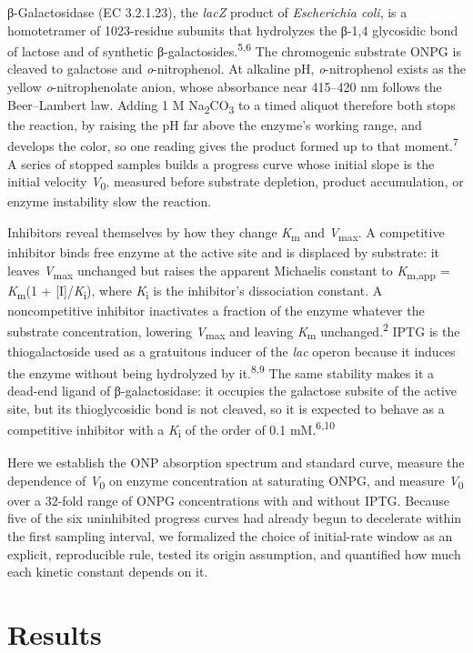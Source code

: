 \documentclass[9pt,twocolumn]{extarticle}
\newcommand{\cit}[1]{\textsuperscript{#1}}
\newcommand{\Km}{\textit{K}\textsubscript{m}}
\newcommand{\Kmapp}{\textit{K}\textsubscript{m,app}}
\newcommand{\Vmax}{\textit{V}\textsubscript{max}}
\newcommand{\Vo}{\textit{V}\textsubscript{0}}
\newcommand{\Ki}{\textit{K}\textsubscript{i}}
\newcommand{\Ecoli}{\textit{Escherichia coli}}
\newcommand{\lac}{\textit{lac}}
\newcommand{\lacZ}{\textit{lacZ}}
\newcommand{\onp}{\textit{o}-nitrophenol}
\newcommand{\dash}{–}
\begin{document}
β-Galactosidase (EC 3.2.1.23), the \lacZ{} product of \Ecoli, is a homotetramer of 1023-residue subunits that hydrolyzes the β-1,4 glycosidic bond of lactose and of synthetic β-galactosides.\cit{5,6} The chromogenic substrate ONPG is cleaved to galactose and \onp. At alkaline pH, \onp{} exists as the yellow \textit{o}-nitrophenolate anion, whose absorbance near 415\dash 420 nm follows the Beer\dash Lambert law. Adding 1 M Na\textsubscript{2}CO\textsubscript{3} to a timed aliquot therefore both stops the reaction, by raising the pH far above the enzyme's working range, and develops the color, so one reading gives the product formed up to that moment.\cit{7} A series of stopped samples builds a progress curve whose initial slope is the initial velocity \Vo, measured before substrate depletion, product accumulation, or enzyme instability slow the reaction.

Inhibitors reveal themselves by how they change \Km{} and \Vmax. A competitive inhibitor binds free enzyme at the active site and is displaced by substrate: it leaves \Vmax{} unchanged but raises the apparent Michaelis constant to \Kmapp{} = \Km(1 + [I]/\Ki), where \Ki{} is the inhibitor's dissociation constant. A noncompetitive inhibitor inactivates a fraction of the enzyme whatever the substrate concentration, lowering \Vmax{} and leaving \Km{} unchanged.\cit{2} IPTG is the thiogalactoside used as a gratuitous inducer of the \lac{} operon because it induces the enzyme without being hydrolyzed by it.\cit{8,9} The same stability makes it a dead-end ligand of β-galactosidase: it occupies the galactose subsite of the active site, but its thioglycosidic bond is not cleaved, so it is expected to behave as a competitive inhibitor with a \Ki{} of the order of 0.1 mM.\cit{6,10}

Here we establish the ONP absorption spectrum and standard curve, measure the dependence of \Vo{} on enzyme concentration at saturating ONPG, and measure \Vo{} over a 32-fold range of ONPG concentrations with and without IPTG. Because five of the six uninhibited progress curves had already begun to decelerate within the first sampling interval, we formalized the choice of initial-rate window as an explicit, reproducible rule, tested its origin assumption, and quantified how much each kinetic constant depends on it.

\section{Results}
\end{document}
